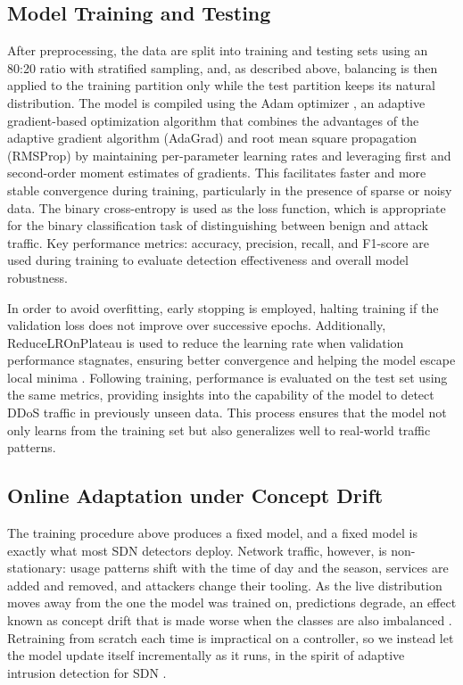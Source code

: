 \documentclass[ASNA,twocolumn]{USG} %
\begin{document}
\subsection{Model Training and Testing}

After preprocessing, the data are split into training and testing sets using an 80:20 ratio with stratified sampling, and, as described above, balancing is then applied to the training partition only while the test partition keeps its natural distribution. The model is compiled using the Adam optimizer \cite{kingma2014adam}, an adaptive gradient-based optimization algorithm that combines the advantages of the adaptive gradient algorithm (AdaGrad) and root mean square propagation (RMSProp) by maintaining per-parameter learning rates and leveraging first and second-order moment estimates of gradients. This facilitates faster and more stable convergence during training, particularly in the presence of sparse or noisy data. The binary cross-entropy is used as the loss function, which is appropriate for the binary classification task of distinguishing between benign and attack traffic. Key performance metrics: accuracy, precision, recall, and F1-score are used during training to evaluate detection effectiveness and overall model robustness.



In order to avoid overfitting, early stopping is employed, halting training if the validation loss does not improve over successive epochs. Additionally, ReduceLROnPlateau is used to reduce the learning rate when validation performance stagnates, ensuring better convergence and helping the model escape local minima \cite{hnamte2024ddos}. Following training, performance is evaluated on the test set using the same metrics, providing insights into the capability of the model to detect DDoS traffic in previously unseen data. This process ensures that the model not only learns from the training set but also generalizes well to real-world traffic patterns.


\subsection{Online Adaptation under Concept Drift}
\label{sec:online_adaptation}

The training procedure above produces a fixed model, and a fixed model is exactly what most SDN detectors deploy. Network traffic, however, is non-stationary: usage patterns shift with the time of day and the season, services are added and removed, and attackers change their tooling. As the live distribution moves away from the one the model was trained on, predictions degrade, an effect known as concept drift that is made worse when the classes are also imbalanced \cite{palli2023combined}. Retraining from scratch each time is impractical on a controller, so we instead let the model update itself incrementally as it runs, in the spirit of adaptive intrusion detection for SDN \cite{alqahtani2024incremental}.
\end{document}
